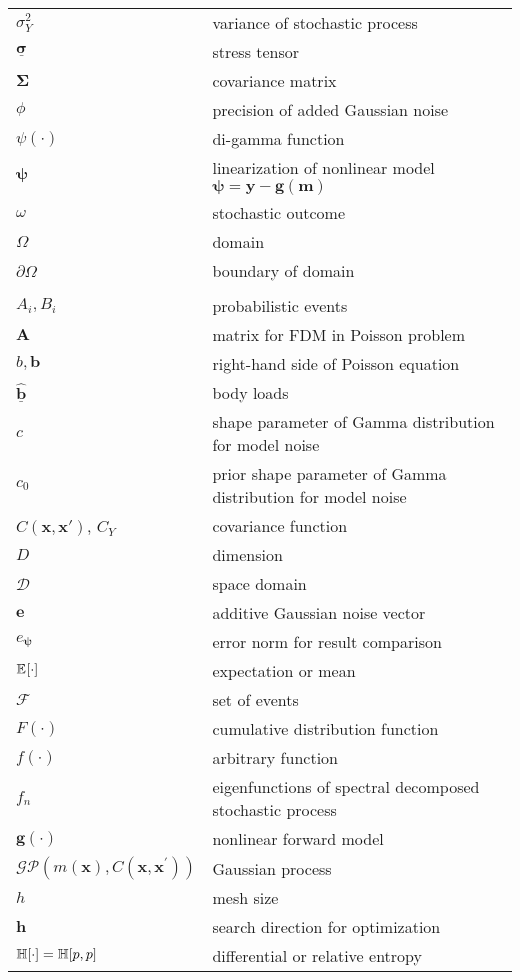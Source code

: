 \begin{longtable}{p{4cm} l}
  $\sigma_Y^2$ & variance of stochastic process \\
  $\underline{\bm{\sigma}}$ & stress tensor \\
  $\bm{\Sigma}$ & covariance matrix \\
  $\phi$ & precision of added Gaussian noise \\
  $\psi(\cdot)$ & di-gamma function \\
  $\bm{\psi}$ & linearization of nonlinear model $\bm{\psi} = \bm{y}-\bm{g}(\bm{m})$ \\
  $\omega$ & stochastic outcome \\
  $\Omega$ & domain \\
  $\partial\Omega$ & boundary of domain \\
  & \\
  $A_i, B_i$ & probabilistic events \\
  $\bm{A}$ & matrix for FDM in Poisson problem \\
  $b, \bm{b}$ & right-hand side of Poisson equation \\
  $\underline{\hat{\bm{b}}}$ & body loads \\
  $c$ & shape parameter of Gamma distribution for model noise \\
  $c_0$ & prior shape parameter of Gamma distribution for model noise \\
  $C(\bm{x},\bm{x}')$, $C_Y$ & covariance function \\
  $D$ & dimension \\
  $\mathcal{D}$ & space domain \\
  $\bm{e}$ & additive Gaussian noise vector \\
  $e_{\bm{\psi}}$ & error norm for result comparison \\
  $\mathbb{E}_{}[\cdot]$ & expectation or mean \\
  $\mathcal{F}$ & set of events \\
  $F(\cdot)$ & cumulative distribution function \\
  $f(\cdot)$ & arbitrary function \\
  $f_n$ & eigenfunctions of spectral decomposed stochastic process \\
  $\bm{g}(\cdot)$ & nonlinear forward model \\
  $\mathcal{GP}(m(\bm{x}), C(\bm{x},\bm{x}^{\prime}))$ & Gaussian process \\
  $h$ & mesh size \\
  $\bm{h}$ & search direction for optimization \\
  $\mathbb{H}[\cdot]=\mathbb{H}[p,p]$ & differential or relative entropy \\

\end{longtable}
